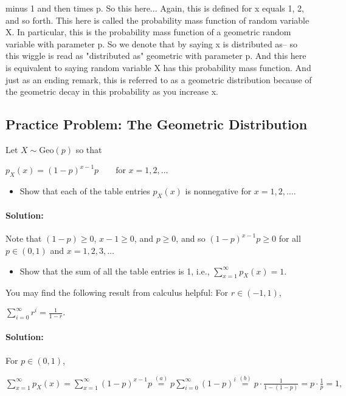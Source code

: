 \documentclass[6008notes.tex]{subfiles}
\begin{document}
minus 1 and then times p. So this here... Again, this is defined for x equals 1, 2, and so forth. This here is called the probability mass function of random variable X. In particular, this is the probability mass function of a geometric random variable with parameter p. So we denote that by saying x is distributed as-- so this wiggle is read as "distributed as" geometric with parameter p. And this here is equivalent to saying random variable X has this probability mass function. And just as an ending remark, this is referred to as a geometric distribution because of the geometric decay in this probability as you increase x.


\subsection{Practice Problem: The Geometric Distribution}

Let $X \sim \text {Geo}(p)$ so that

{\centering$p_ X(x) = (1-p)^{x-1} p\qquad \text {for }x=1, 2, \dots$ \par}
 
\begin{itemize}
\item Show that each of the table entries $p_X(x)$ is nonnegative for $x = 1, 2, \dots$.
\end{itemize}

\paragraph{Solution: } Note that $(1-p) \ge 0$, $x-1 \ge 0$, and $p \ge 0$, and so $(1-p)^{x-1}p \ge 0$ for all $p \in (0,1)$ and $x=1,2,3,\dots$

\begin{itemize}
\item Show that the sum of all the table entries is 1, i.e., $\sum _{x=1}^\infty p_ X(x) = 1$.
\end{itemize}

You may find the following result from calculus helpful: For $r\in (-1,1)$,

{\centering$\sum _{i=0}^{\infty }r^{i}=\frac{1}{1-r}.$ \par}

\paragraph{Solution: } For $p \in (0,1)$,

{\centering$\sum _{x=1}^{\infty }p_{X}(x)=\sum _{x=1}^{\infty }(1-p)^{x-1}p\overset {(a)}{=}p\sum _{i=0}^{\infty }(1-p)^{i}\overset {(b)}{=}p\cdot \frac{1}{1-(1-p)}=p\cdot \frac{1}{p}=1,$ \par}
 
\end{document}
